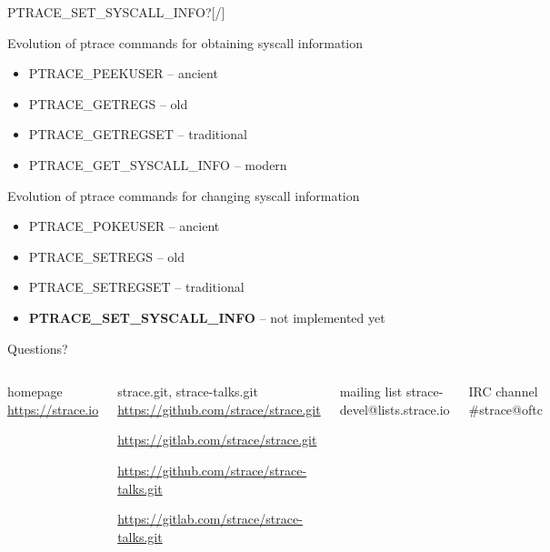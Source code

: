 \documentclass[unicode,aspectratio=169,xcolor={table,dvipsnames,usenames}]{beamer}
\begin{document}
\begin{frame}{\Large PTRACE\_SET\_SYSCALL\_INFO?\hfill [\insertframenumber/\inserttotalframenumber]}
\Large
\begin{block}{Evolution of ptrace commands for obtaining syscall information}
\begin{itemize}
	\item PTRACE\_PEEKUSER -- ancient
	\item PTRACE\_GETREGS -- old
	\item PTRACE\_GETREGSET -- traditional
	\item PTRACE\_GET\_SYSCALL\_INFO -- modern
\end{itemize}
\end{block}

\begin{block}{Evolution of ptrace commands for changing syscall information}
\begin{itemize}
	\item PTRACE\_POKEUSER -- ancient
	\item PTRACE\_SETREGS -- old
	\item PTRACE\_SETREGSET -- traditional
	\item \textbf{PTRACE\_SET\_SYSCALL\_INFO} -- not implemented yet
\end{itemize}
\end{block}
\end{frame}

{
\begin{frame}[noframenumbering]{Questions?}
	\begin{columns}
		\column{9cm}
\begin{block}{\large homepage}
	\url{https://strace.io}
\end{block}
\begin{block}{\large strace.git, strace-talks.git}
	\url{https://github.com/strace/strace.git}

	\url{https://gitlab.com/strace/strace.git}

\smallskip

	\url{https://github.com/strace/strace-talks.git}

	\url{https://gitlab.com/strace/strace-talks.git}
\end{block}
\begin{block}{\large mailing list}
	strace-devel@lists.strace.io
\end{block}
\begin{block}{\large IRC channel}
	\#strace@oftc
\end{block}
		\column{3cm}
			\centerline{}
	\end{columns}
\end{frame}
}
\end{document}
